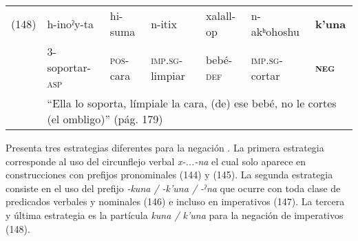 {{\small
\noindent \begin{tabular}{lllllll}
(148) & h-inoˀy-ta & hi-suma & n-itix & xalall-op & n-akʰohoshu & \textbf{k’una} \\
& \textsc{3-}soportar-\textsc{asp} & \textsc{pos}-cara & \textsc{imp.sg-}limpiar & bebé-\textsc{def} & \textsc{imp.sg-}cortar & \textsc{\textbf{neg}} \\
& \multicolumn{6}{l}{``Ella lo soporta, límpiale la cara, (de) ese bebé, no le cortes (el ombligo)'' (pág. 179)}
\end{tabular} \vspace{0.5cm}}

}

Presenta tres estrategias diferentes para la negación \textcolor{MidnightBlue}{\citep{chimariko}}. La primera estrategia corresponde al uso del circunflejo verbal {\setmainfont{Charis SIL} \textit{x-...-na}} el cual solo aparece en construcciones con prefijos pronominales (144) y (145). La segunda estrategia consiste en el uso del prefijo {\setmainfont{Charis SIL} \textit{-kuna / -k'una / -ˀna}} que ocurre con toda clase de predicados verbales y nominales (146) e incluso en imperativos (147). La tercera y última estrategia es la partícula {\setmainfont{Charis SIL} \textit{kuna / k'una}} para la negación de imperativos (148).
